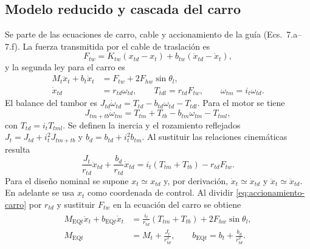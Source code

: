 \documentclass[a4paper,10pt,onecolumn,journal]{ieeeconf}
\numberwithin{equation}{section}
\newcommand{\EQt}{\mathrm{EQ}t}
\begin{document}
	\subsection{Modelo reducido y cascada del carro}
	Se parte de las ecuaciones de carro, cable y accionamiento de la guía (Ecs.~7.a--7.f). La fuerza transmitida por el cable de traslación es
	\begin{equation}
		F_{tw}=K_{tw}(x_{td}-x_t)+b_{tw}(\dot x_{td}-\dot x_t),
		\label{eq:cable-carro}
	\end{equation}
	y la segunda ley para el carro es
	\begin{align}
		M_t\ddot x_t+b_t\dot x_t&=F_{tw}+2F_{hw}\sin\theta_l,\\
		\dot x_{td}&=r_{td}\omega_{td},\qquad
		T_{tdl}=r_{td}F_{tw},\qquad \omega_{tm}=i_t\omega_{td}.
	\end{align}
	El balance del tambor es $J_{td}\dot\omega_{td}=T_{td}-b_{td}\omega_{td}-T_{tdl}$. Para el motor se tiene
	\begin{equation}
		J_{tm+tb}\dot\omega_{tm}=T_{tm}+T_{tb}-b_{tm}\omega_{tm}-T_{tml},
	\end{equation}
	con $T_{td}=i_tT_{tml}$. Se definen la inercia y el rozamiento reflejados $J_t=J_{td}+i_t^2J_{tm+tb}$ y $b_d=b_{td}+i_t^2b_{tm}$. Al sustituir las relaciones cinemáticas resulta
	\begin{equation}
		\frac{J_t}{r_{td}}\ddot x_{td}+\frac{b_d}{r_{td}}\dot x_{td}
		=i_t(T_{tm}+T_{tb})-r_{td}F_{tw}.
		\label{eq:accionamiento-carro}
	\end{equation}
	Para el diseño nominal se supone $x_t\simeq x_{td}$ y, por derivación, $\dot x_t\simeq\dot x_{td}$ y $\ddot x_t\simeq\ddot x_{td}$. En adelante se usa $x_t$ como coordenada de control. Al dividir \eqref{eq:accionamiento-carro} por $r_{td}$ y sustituir $F_{tw}$ en la ecuación del carro se obtiene
	\begin{align}
		M_{\EQt}\ddot x_t+b_{\EQt}\dot x_t
		&=\frac{i_t}{r_{td}}(T_{tm}+T_{tb})+2F_{hw}\sin\theta_l,\\
		M_{\EQt}&=M_t+\frac{J_t}{r_{td}^2},\qquad
		b_{\EQt}=b_t+\frac{b_d}{r_{td}^2}.
	\end{align}
\end{document}
